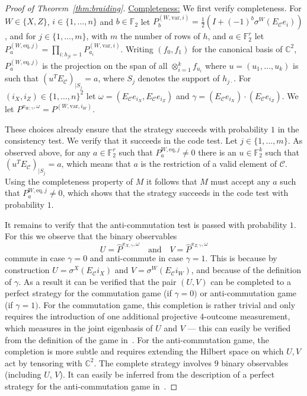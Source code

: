 \documentclass[11pt]{article}
\theoremstyle{definition}
\newcommand{\code}{\mathscr{C}}
\newcommand{\Id}{\ensuremath{I}}
\newcommand{\field}{\mathbb{F}_2}
\newcommand{\C}{\ensuremath{\mathbb{C}}}
\newcommand{\F}{\ensuremath{\mathbb{F}}}
\newcommand{\eq}{\mathrm{eq}}
\newcommand{\var}{\mathrm{var}}
\begin{document}
\begin{proof}[Proof of Theorem~\ref{thm:braiding}]
\underline{Completeness:} We first verify completeness. For $W\in\{X,Z\}$, $i\in\{1,\ldots,n\}$ and $b\in \F_2$ let $P^{(W,\var,i)}_b = \frac{1}{2}(\Id + (-1)^b\sigma^W(E_\code e_i))$, and for $j\in\{1,\ldots,m\}$, with $m$ the number of rows of $h$, and $a\in \F_2^r$ let $P^{(W,\eq,j)}_a = \prod_{i: h_{ji}=1} P^{(W,\var,i)}_{a_i}$. Writing $(f_0,f_1)$ for the canonical basis of $\C^2$, $P^{(W,\eq,j)}_a$ is the projection on the span of all $\otimes_{i=1}^k f_{u_i}$ where $u=(u_1,\ldots,u_k)$ is such that $(u^T E_\code)_{|S_j}=a$, where $S_j$ denotes the support of $h_{j\cdot}$.   
For $(i_X,i_Z)\in \{1,\ldots,n\}^2 $ let $\omega=(E_\code e_{i_X}, E_\code e_{i_Z})$ and $\gamma =(E_\code e_{i_X}) \cdot(E_\code e_{i_Z}) $. We let $P^{x_{W,\gamma},\omega} = P^{(W,\var,i_W)}$. 

These choices already ensure that the strategy succeeds with probability $1$ in the consistency test. We verify that it succeeds in the code test. Let $j\in\{1,\ldots,m\}$. As observed above, for any $a\in\field^r$ such that $P^{W,\eq,j}_a\neq 0$ there is an $u\in \field^k$ such that $(u^TE_\code)_{|S_j}=a$, which means that $a$ is the restriction of a valid element of $\code$. 
Using the completeness property of $M$ it follows that $M$ must accept any $a$ such that $P^{W,\eq,j}_a\neq 0$, which shows that the strategy succeeds in the code test with probability $1$. 

It remains to verify that the anti-commutation test is passed with probability $1$. For this we observe that 
the binary observables 
\[ U=\widehat{ P}^{x_{X,\gamma},\omega} \quad\text{and}\quad V= \widehat{P}^{x_{Z,\gamma},\omega} \]
commute in case $\gamma=0$ and anti-commute in case $\gamma=1$. This is because by construction $U=\sigma^X(E_\code i_X)$ and $V=\sigma^W(E_\code i_W)$, and because of the definition of $\gamma$. As a result it can be verified that the pair $(U,V)$ can be completed to a perfect strategy for the commutation game (if $\gamma=0)$ or anti-commutation game (if $\gamma=1)$.
For the commutation game, this completion is rather trivial and only requires the introduction of one additional projective $4$-outcome measurement, which measures in the joint eigenbasis of $U$ and $V$ --- this can easily be verified from the definition of the game in~\cite[Section 3.1]{de2022spectral}. For the anti-commutation game, the completion is more subtle and requires extending the Hilbert space on which $U,V$ act by tensoring with $\mathbb{C}^2$. The complete strategy involves $9$ binary observables (including $U$, $V$). It can easily be inferred from the description of a perfect strategy for the anti-commutation game in~\cite[Section 3.1 and Figure 10]{coladangelo2017robust}. 


\end{proof}
\end{document}
